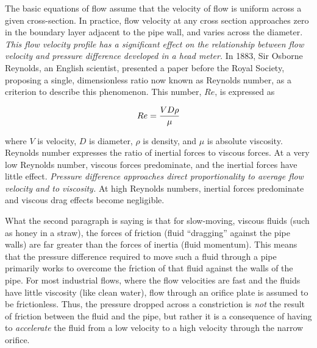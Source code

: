\vskip 10pt {\narrower \noindent \baselineskip5pt

The basic equations of flow assume that the velocity of flow is uniform across a given cross-section.  In practice, flow velocity at any cross section approaches zero in the boundary layer adjacent to the pipe wall, and varies across the diameter.  \textit{This flow velocity profile has a significant effect on the relationship between flow velocity and pressure difference developed in a head meter.}  In 1883, Sir Osborne Reynolds, an English scientist, presented a paper before the Royal Society, proposing a single, dimensionless ratio now known as Reynolds number, as a criterion to describe this phenomenon.  This number, $Re$, is expressed as

$$Re = {{V D \rho} \over \mu}$$

\noindent
where $V$ is velocity, $D$ is diameter, $\rho$ is density, and $\mu$ is absolute viscosity.  Reynolds number expresses the ratio of inertial forces to viscous forces.  At a very low Reynolds number, viscous forces predominate, and the inertial forces have little effect.  \textit{Pressure difference approaches direct proportionality to average flow velocity and to viscosity.}  At high Reynolds numbers, inertial forces predominate and viscous drag effects become negligible.

\par} \vskip 10pt

What the second paragraph is saying is that for slow-moving, viscous fluids (such as honey in a straw), the forces of friction (fluid ``dragging'' against the pipe walls) are far greater than the forces of inertia (fluid momentum).  This means that the pressure difference required to move such a fluid through a pipe primarily works to overcome the friction of that fluid against the walls of the pipe.  For most industrial flows, where the flow velocities are fast and the fluids have little viscosity (like clean water), flow through an orifice plate is assumed to be frictionless.  Thus, the pressure dropped across a constriction is \textit{not} the result of friction between the fluid and the pipe, but rather it is a consequence of having to \textit{accelerate} the fluid from a low velocity to a high velocity through the narrow orifice.

